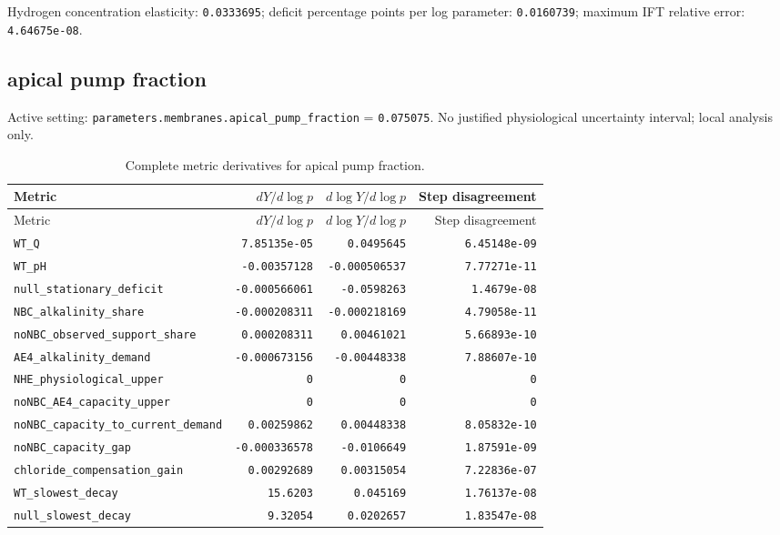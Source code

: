 Hydrogen concentration elasticity: \texttt{0.0333695}; deficit percentage points per log parameter: \texttt{0.0160739}; maximum IFT relative error: \texttt{4.64675e-08}.\par

\subsection*{apical pump fraction}
Active setting: \nolinkurl{parameters.membranes.apical_pump_fraction} = \texttt{0.075075}. No justified physiological uncertainty interval; local analysis only.


\begingroup\scriptsize
\setlength{\tabcolsep}{3pt}
\begin{longtable}{p{.44\linewidth}rrr}
\caption{Complete metric derivatives for apical pump fraction.}\\
\toprule
Metric & $dY/d\log p$ & $d\log Y/d\log p$ & Step disagreement \\
\midrule\endfirsthead
\toprule
Metric & $dY/d\log p$ & $d\log Y/d\log p$ & Step disagreement \\
\midrule\endhead
\bottomrule\endfoot
\nolinkurl{WT_Q} & \texttt{7.85135e-05} & \texttt{0.0495645} & \texttt{6.45148e-09} \\
\nolinkurl{WT_pH} & \texttt{-0.00357128} & \texttt{-0.000506537} & \texttt{7.77271e-11} \\
\nolinkurl{null_stationary_deficit} & \texttt{-0.000566061} & \texttt{-0.0598263} & \texttt{1.4679e-08} \\
\nolinkurl{NBC_alkalinity_share} & \texttt{-0.000208311} & \texttt{-0.000218169} & \texttt{4.79058e-11} \\
\nolinkurl{noNBC_observed_support_share} & \texttt{0.000208311} & \texttt{0.00461021} & \texttt{5.66893e-10} \\
\nolinkurl{AE4_alkalinity_demand} & \texttt{-0.000673156} & \texttt{-0.00448338} & \texttt{7.88607e-10} \\
\nolinkurl{NHE_physiological_upper} & \texttt{0} & \texttt{0} & \texttt{0} \\
\nolinkurl{noNBC_AE4_capacity_upper} & \texttt{0} & \texttt{0} & \texttt{0} \\
\nolinkurl{noNBC_capacity_to_current_demand} & \texttt{0.00259862} & \texttt{0.00448338} & \texttt{8.05832e-10} \\
\nolinkurl{noNBC_capacity_gap} & \texttt{-0.000336578} & \texttt{-0.0106649} & \texttt{1.87591e-09} \\
\nolinkurl{chloride_compensation_gain} & \texttt{0.00292689} & \texttt{0.00315054} & \texttt{7.22836e-07} \\
\nolinkurl{WT_slowest_decay} & \texttt{15.6203} & \texttt{0.045169} & \texttt{1.76137e-08} \\
\nolinkurl{null_slowest_decay} & \texttt{9.32054} & \texttt{0.0202657} & \texttt{1.83547e-08} \\
\end{longtable}
\endgroup


